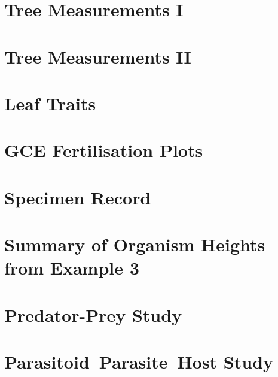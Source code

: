 \documentclass[article,oneside]{memoir}
\begin{document}
\section{Tree Measurements I}
\section{Tree Measurements II}
\section{Leaf Traits}
\section{GCE Fertilisation Plots}
\section{Specimen Record}
\section{Summary of Organism Heights from Example 3}
\section{Predator-Prey Study}
\section{Parasitoid--Parasite--Host Study}
\end{document}
